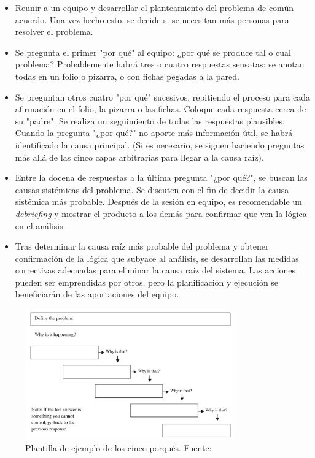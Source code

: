 \begin{itemize}
    \item Reunir a un equipo y desarrollar el planteamiento del problema de común acuerdo. Una vez hecho esto, se decide si se necesitan más personas para resolver el problema.
    \item Se pregunta el primer "por qué" al equipo: ¿por qué se produce tal o cual problema? Probablemente habrá tres o cuatro respuestas sensatas: se anotan todas en un folio o pizarra, o con fichas pegadas a la pared.
    \item Se preguntan otros cuatro "por qué" sucesivos, repitiendo el proceso para cada afirmación en el folio, la pizarra o las fichas. Coloque cada respuesta cerca de su "padre". Se realiza un seguimiento de todas las respuestas plausibles. Cuando la pregunta "¿por qué?" no aporte más información útil, se habrá identificado la causa principal. (Si es necesario, se siguen haciendo preguntas más allá de las cinco capas arbitrarias para llegar a la causa raíz).
    \item Entre la docena de respuestas a la última pregunta "¿por qué?", se buscan las causas sistémicas del problema. Se discuten con el fin de decidir la causa sistémica más probable. Después de la sesión en equipo, es recomendable un \textit{debriefing} y mostrar el producto a los demás para confirmar que ven la lógica en el análisis.
    \item Tras determinar la causa raíz más probable del problema y obtener confirmación de la lógica que subyace al análisis, se desarrollan las medidas correctivas adecuadas para eliminar la causa raíz del sistema. Las acciones pueden ser emprendidas por otros, pero la planificación y ejecución se beneficiarán de las aportaciones del equipo.
\end{itemize}

\begin{figure}
    \centering
    \includegraphics[width=0.8\textwidth]{img/five-whys.png}
    \caption{Plantilla de ejemplo de los cinco porqués. Fuente: }
    \label{fig:five-whys}
\end{figure}

